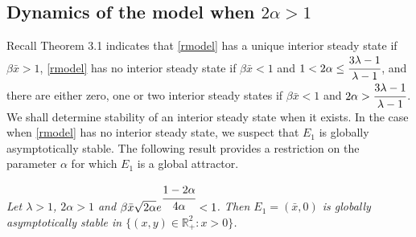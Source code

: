 \documentclass[11pt]{article}
\begin{document}
\subsection{Dynamics of the model when $2\alpha>1$}
Recall Theorem 3.1 indicates that \eqref{rmodel} has a unique
interior steady state if $\beta \bar x>1$, \eqref{rmodel} has no
interior steady state if $\beta \bar x<1$ and $1<2\alpha\leq
\cfrac{3\lambda-1}{\lambda-1}$, and there are either zero, one or
two interior steady states if $\beta \bar x<1$ and
$2\alpha>\cfrac{3\lambda-1}{\lambda-1}$. We shall determine
stability of an interior steady state when it exists. In the case
when \eqref{rmodel} has no interior steady state, we suspect that
$E_1$ is globally asymptotically stable. The following result
provides a restriction on the parameter $\alpha$ for which $E_1$
is  a global attractor.




\medskip

 {\em Let $\lambda>1$, $2\alpha>1$ and
$\beta \bar x \sqrt{2\alpha}e^{\cfrac{1-2\alpha}{4\alpha}}<1$.
Then $E_1=(\bar x, 0)$ is globally asymptotically stable in
$\{(x,y)\in\mathbb{R}_+^2: x>0\}$.}
\end{document}

